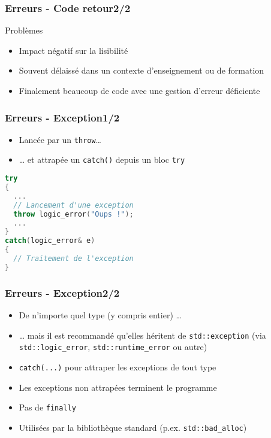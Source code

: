 \documentclass[C++.tex]{subfiles}
\begin{document}
\begin{frame}
	\frametitle{Erreurs -  Code retour\titlehfill{}2/2}
	\begin{alertblock}{Problèmes}
		\begin{itemize}
			\item Impact négatif sur la lisibilité
			\item Souvent délaissé dans un contexte d'enseignement ou de formation


			\item Finalement beaucoup de code avec une gestion d'erreur déficiente
		\end{itemize}
	\end{alertblock}
\end{frame}

\begin{frame}[fragile]
	\frametitle{Erreurs - Exception\titlehfill{}1/2}
	\begin{itemize}
		\item Lancée par un \lstinline|throw|\dots{}
		\item \dots{} et attrapée un \lstinline|catch()| depuis un bloc \lstinline|try|
	\end{itemize}

	\begin{lstlisting}[language=C++]
try
{
  ...
  // Lancement d'une exception
  throw logic_error("Oups !");
  ...
}
catch(logic_error& e)
{
  // Traitement de l'exception
}\end{lstlisting}

\end{frame}

\begin{frame}
	\frametitle{Erreurs - Exception\titlehfill{}2/2}
	\begin{itemize}
		\item De n'importe quel type (y compris entier) \dots{}
		\item \dots{} mais il est recommandé qu'elles héritent de \lstinline|std::exception| (via \lstinline|std::logic_error|, \lstinline|std::runtime_error| ou autre)
		\item \lstinline{catch(...)} pour attraper les exceptions de tout type
		\item Les exceptions non attrapées terminent le programme
		\item Pas de \lstinline[keywordstyle=\color{black}]|finally|
		\item Utilisées par la bibliothèque standard (p.ex. \lstinline|std::bad_alloc|)
	\end{itemize}
\end{frame}
\end{document}
